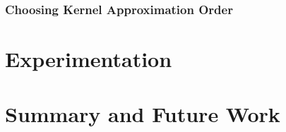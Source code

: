 \subsubsection{Choosing Kernel Approximation Order}
\label{sss,krr,pract,mod,h}


\section{Experimentation}
\label{s,krr,exp}

\section{Summary and Future Work}
\label{s,krr,summ}


